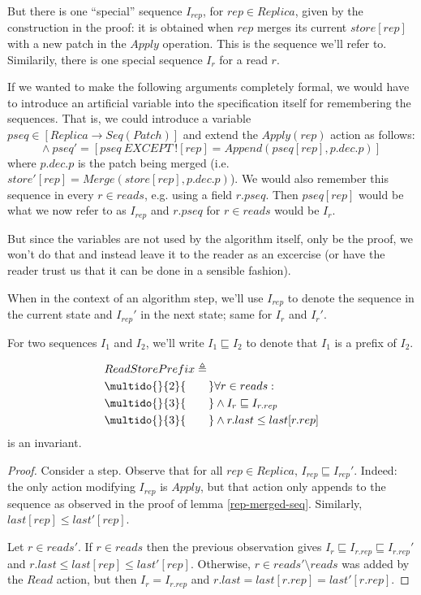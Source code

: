 \documentclass[12pt,a4paper,en]{pracamgr}
\newcommand{\ind}[1]{\multido{}{#1}{\qquad}}
\begin{document}
But there is one ``special'' sequence $I_{rep}$, for $rep \in Replica$, given by the construction in the proof: it is obtained when $rep$ merges its current $store[rep]$ with a new patch in the $Apply$ operation. This is the sequence we'll refer to. Similarily, there is one special sequence $I_r$ for a read $r$.

If we wanted to make the following arguments completely formal, we would have to introduce an artificial variable into the specification itself for remembering the sequences. That is, we could introduce a variable $pseq \in [Replica \rightarrow Seq(Patch)]$ and extend the $Apply(rep)$ action as follows:
$$ \land\ pseq' = [pseq\ EXCEPT\ ![rep] = Append(pseq[rep], p.dec.p)] $$
where $p.dec.p$ is the patch being merged (i.e. $store'[rep] = Merge(store[rep], p.dec.p)$). We would also remember this sequence in every $r \in reads$, e.g. using a field $r.pseq$. Then $pseq[rep]$ would be what we now refer to as $I_{rep}$ and $r.pseq$ for $r \in reads$ would be $I_r$.

But since the variables are not used by the algorithm itself, only be the proof, we won't do that and instead leave it to the reader as an excercise (or have the reader trust us that it can be done in a sensible fashion).

When in the context of an algorithm step, we'll use $I_{rep}$ to denote the sequence in the current state and $I_{rep}'$ in the next state; same for $I_r$ and $I_r'$.

For two sequences $I_1$ and $I_2$, we'll write $I_1 \sqsubseteq I_2$ to denote that $I_1$ is a prefix of $I_2$.

\begin{lemma}
    \begin{align*}
        & ReadStorePrefix \triangleq\\
        & \ind{2} \forall r \in reads:\\
        & \ind{3} \land I_r \sqsubseteq I_{r.rep}\\
        & \ind{3} \land r.last \le last[r.rep]
    \end{align*}
    is an invariant.
\end{lemma}
\begin{proof}
    Consider a step. Observe that for all $rep \in Replica$, $I_{rep} \sqsubseteq I_{rep}'$. Indeed: the only action modifying $I_{rep}$ is $Apply$, but that action only appends to the sequence as observed in the proof of lemma \ref{rep-merged-seq}. Similarly, $last[rep] \le last'[rep]$.

    Let $r \in reads'$. If $r \in reads$ then the previous observation gives $I_r \sqsubseteq I_{r.rep} \sqsubseteq I_{r.rep}'$ and $r.last \le last[rep] \le last'[rep]$. Otherwise, $r \in reads' \setminus reads$ was added by the $Read$ action, but then $I_r = I_{r.rep}$ and $r.last = last[r.rep] = last'[r.rep]$.
\end{proof}
\end{document}
